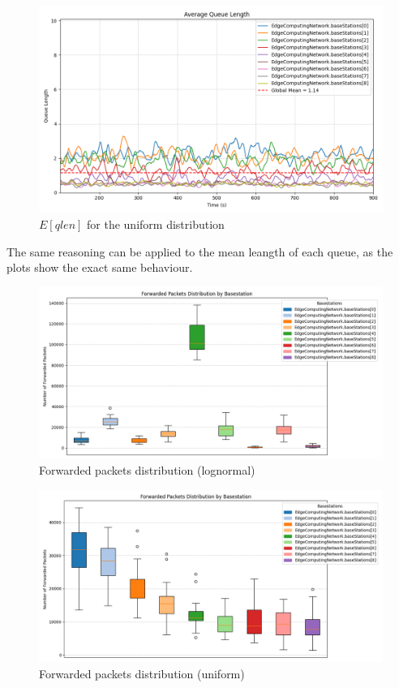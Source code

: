\documentclass{report}
\begin{document}
\begin{figure}[H]
    \centering
    \includegraphics[width=\textwidth]{img/plots/uni_1e3_B/qlen.png}
    \caption{$E[qlen]$ for the uniform distribution}
\end{figure}


\begin{flushleft}
The same reasoning can be applied to the mean leangth of each queue, as the plots show the exact same behaviour.
\end{flushleft}

\begin{figure}[H]
    \centering
    \includegraphics[width=\textwidth]{img/plots/log_1e3_B/forwarded.png}
    \caption{Forwarded packets distribution (lognormal)}
\end{figure}

\begin{figure}[H]
    \centering
    \includegraphics[width=\textwidth]{img/plots/uni_1e3_B/forwarded.png}
    \caption{Forwarded packets distribution (uniform)}
\end{figure}
\end{document}

